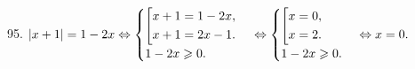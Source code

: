 95. $|x+1|=1-2x\Leftrightarrow\begin{cases}\left[
      \begin{gathered} x+1=1-2x,\hfill\\
      x+1=2x-1.\hfill \end{gathered}\right.\\
1-2x\geqslant0.\end{cases}\Leftrightarrow\begin{cases}\left[
      \begin{gathered} x=0,\hfill\\
      x=2.\hfill \end{gathered}\right.\\
1-2x\geqslant0.\end{cases}\Leftrightarrow x=0.$\\
